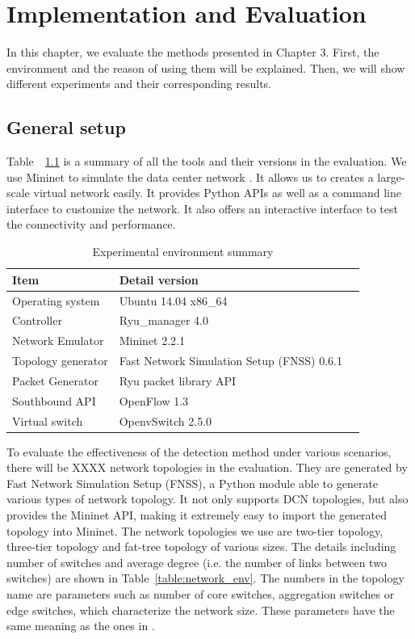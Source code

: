 \chapter{Implementation and Evaluation}
\label{Implementation_and_Evaluation}
In this chapter, we evaluate the methods presented in Chapter 3. First, the environment and the reason of using them will be explained. Then, we will show different experiments and their corresponding results.

\section{General setup}
Table~~\ref{table:Experiment_table} is a summary of all the tools and their versions in the evaluation. We use Mininet to simulate the data center network \cite{Mininet}. It allows us to creates a large-scale virtual network easily. It provides Python APIs as well as a command line interface to customize the network. It also offers an interactive interface to test the connectivity and performance.

\begin{table}[H]
\centering
\caption{Experimental environment summary}
\begin{tabular}{|l|p{4cm}|p{4.5cm}}
\hline Item & Detail version \\
\hline
\hline Operating system & Ubuntu 14.04 x86\_64 \\
\hline Controller & Ryu\_manager 4.0 \\
\hline Network Emulator & Mininet 2.2.1 \\
\hline Topology generator & Fast Network Simulation Setup (FNSS) 0.6.1\\
\hline Packet Generator & Ryu packet library API \\
\hline Southbound API & OpenFlow 1.3 \\
\hline Virtual switch & OpenvSwitch 2.5.0 \\
\hline 
\end{tabular}
\label{table:Experiment_table}
\end{table}

To evaluate the effectiveness of the detection method under various scenarios, there will be XXXX network topologies in the evaluation. They are generated by Fast Network Simulation Setup (FNSS), a Python module able to generate various types of network topology. It not only supports DCN topologies, but also provides the Mininet API, making it extremely easy to import the generated topology into Mininet. The network topologies we use are two-tier topology, three-tier topology and fat-tree topology of various sizes. The details including number of switches and average degree (i.e. the number of links between two switches) are shown in Table~\ref{table:network_env}. The numbers in the topology name are parameters such as number of core switches, aggregation switches or edge switches, which characterize the network size. These parameters have the same meaning as the ones in \cite{FNSS}.

